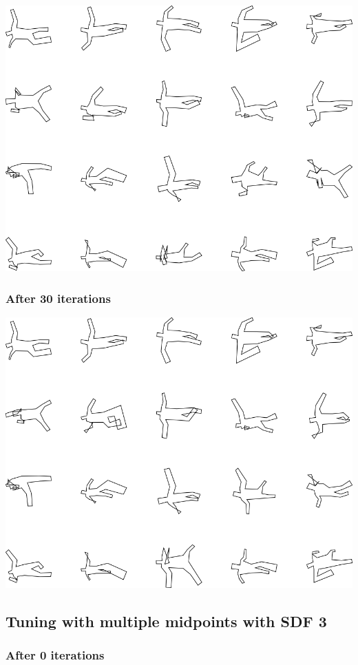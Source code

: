 \includegraphics[width=6in]{output/3.learning/multi_tuning/multi_tuning_iter20_.png}
\subsubsection{After 30 iterations}

\includegraphics[width=6in]{output/3.learning/multi_tuning/multi_tuning_iter30_.png}
\subsection{Tuning with multiple midpoints with SDF 3}

\subsubsection{After 0 iterations}

